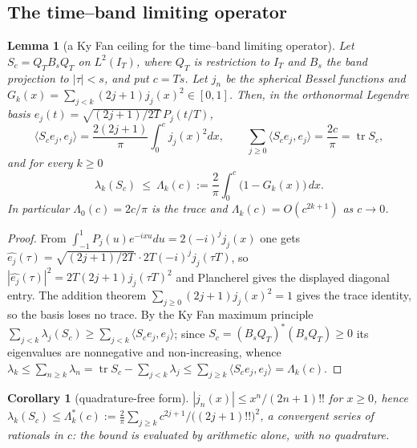 \documentclass[11pt]{amsart}
\newtheorem{lemma}[theorem]{Lemma}
\newtheorem{corollary}[theorem]{Corollary}
\theoremstyle{definition}
\theoremstyle{remark}
\newcommand{\IT}{I_T}
\begin{document}
\subsection{The time--band limiting operator}
\begin{lemma}[a Ky Fan ceiling for the time--band limiting operator]\label{lem:KyFan}
Let $S_c=Q_TB_sQ_T$ on $L^2(\IT)$, where $Q_T$ is restriction to $\IT$ and $B_s$ the band projection
to $|\tau|<s$, and put $c=Ts$. Let $j_n$ be the spherical Bessel functions and
$G_k(x)=\sum_{j<k}(2j+1)j_j(x)^2\in[0,1]$. Then, in the orthonormal Legendre basis
$e_j(t)=\sqrt{(2j+1)/2T}\,P_j(t/T)$,
\[
\langle S_ce_j,e_j\rangle=\frac{2(2j+1)}\pi\int_0^cj_j(x)^2dx,\qquad
\sum_{j\ge0}\langle S_ce_j,e_j\rangle=\frac{2c}\pi=\operatorname{tr}S_c ,
\]
and for every $k\ge0$
\[
\lambda_k(S_c)\ \le\ \Lambda_k(c):=\frac2\pi\int_0^c\big(1-G_k(x)\big)\,dx .
\]
In particular $\Lambda_0(c)=2c/\pi$ is the trace and $\Lambda_k(c)=O(c^{2k+1})$ as $c\to0$.
\end{lemma}
\begin{proof}
From $\int_{-1}^1P_j(u)e^{-ixu}du=2(-i)^jj_j(x)$ one gets
$\widehat{e_j}(\tau)=\sqrt{(2j+1)/2T}\,\cdot2T(-i)^jj_j(\tau T)$, so
$|\widehat{e_j}(\tau)|^2=2T(2j+1)j_j(\tau T)^2$ and Plancherel gives the displayed diagonal entry.
The addition theorem $\sum_{j\ge0}(2j+1)j_j(x)^2=1$ gives the trace identity, so the basis loses no
trace. By the Ky Fan maximum principle $\sum_{j<k}\lambda_j(S_c)\ge\sum_{j<k}\langle
S_ce_j,e_j\rangle$; since $S_c=(B_sQ_T)^*(B_sQ_T)\ge0$ its eigenvalues are nonnegative and
non-increasing, whence
$\lambda_k\le\sum_{n\ge k}\lambda_n=\operatorname{tr}S_c-\sum_{j<k}\lambda_j\le\sum_{j\ge k}\langle
S_ce_j,e_j\rangle=\Lambda_k(c)$.
\end{proof}

\begin{corollary}[quadrature-free form]\label{cor:P1}
$|j_n(x)|\le x^n/(2n+1)!!$ for $x\ge0$, hence
$\lambda_k(S_c)\le\Lambda^*_k(c):=\frac2\pi\sum_{j\ge k}c^{2j+1}/\big((2j+1)!!\big)^2$, a convergent
series of rationals in $c$: the bound is evaluated by arithmetic alone, with no quadrature.
\end{corollary}
\end{document}
